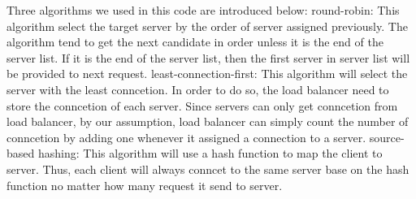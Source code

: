 Three algorithms we used in this code are introduced below:
\ci round-robin: This algorithm select the target server by the order of server
assigned previously.  The algorithm tend to get the next candidate in order
unless it is the end of the server list.  If it is the end of the server list,
then the first server in server list will be provided to next request.
\cii least-connection-first: This algorithm will select the server with the
least conncetion.  In order to do so, the load balancer need to store the
conncetion of each server.  Since servers can only get conncetion from load
balancer, by our assumption, load balancer can simply count the number of
conncetion by adding one whenever it assigned a connection to a server.
\ciii source-based hashing: This algorithm will use a hash function to map the
client to server. Thus, each client will always conncet to the same server base
on the hash function no matter how many request it send to server.


